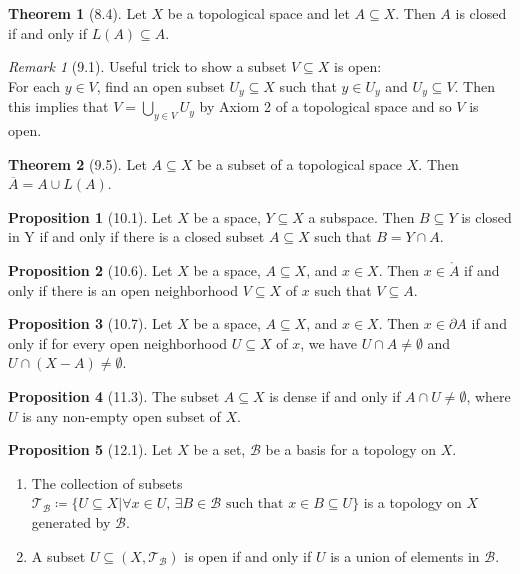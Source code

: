 \documentclass{article}
\newcommand{\B}{\ensuremath{\mathcal{B}}}
\newcommand{\nbd}{neighborhood}
\newcommand{\Iff}{if and only if}
\newcommand{\ts}{topological space}
\newcommand{\es}{\ensuremath{\emptyset}}
\newcommand{\coleq}{\ensuremath{\coloneqq}}
\newcommand{\closure}[1]{\ensuremath{\overline{#1}}}
\newcommand{\tp}{\ensuremath{\mathscr{T}}}
\newcommand{\Ts}[2]{\ensuremath{(#1,#2)}}
\newcommand{\union}{\cup}
\newcommand{\Union}{\bigcup}
\newcommand{\inter}{\cap}
\newcommand{\interior}[1]{\ensuremath{\mathring{#1}}}
\newcommand{\bound}[1]{\ensuremath{\partial #1}}
\renewcommand{\Subset}{\subseteq}
\theoremstyle{definition}
\newtheorem*{thm}{Theorem}
\newtheorem*{prop}{Proposition}
\theoremstyle{remark}
\newtheorem*{rmk}{Remark}
\begin{document}
{        \begin{thm}[8.4]
            Let $X$ be a \ts{} and let $A \Subset X$. Then $A$ is closed \Iff{} $L(A) \Subset A$.
        \end{thm}
        
        \begin{rmk}[9.1]
            Useful trick to show a subset $V \Subset X$ is open:\\ For each $y\in V$, find an open subset $U_y \Subset X$ such that $y \in U_y$ and $U_y \Subset V$. Then this implies that $V=\Union\limits_{y \in V} U_y$ by Axiom 2 of a \ts{} and so $V$ is open.
        \end{rmk}
        
        \begin{thm}[9.5]
            Let $A \Subset X$ be a subset of a \ts{} $X$. Then $\closure{A}=A \union L(A)$.
        \end{thm}
        
        \begin{prop}[10.1]
            Let $X$ be a space, $Y \Subset X$ a subspace. Then $B \Subset Y$ is closed in Y \Iff{} there is a closed subset $A \Subset X$ such that $B=Y \inter A$.
        \end{prop}
        
        \begin{prop}[10.6]
            Let $X$ be a space, $A \Subset X$, and $x \in X$. Then $x\in \interior{A}$ \Iff{} there is an open \nbd{} $V \Subset X$ of $x$ such that $V \Subset A$.
        \end{prop}
        
        \begin{prop}[10.7]
            Let $X$ be a space, $A\Subset X$, and $x \in X$. Then $x \in \bound{A}$ \Iff{} for every open \nbd{} $U \Subset X$ of $x$, we have $U \inter A \neq \es$ and $U \inter (X-A) \neq \es$.
        \end{prop}
        
        \begin{prop}[11.3]
            The subset $A \Subset X$ is dense \Iff{} $A\inter U \neq \es$, where $U$ is any non-empty open subset of $X$.
        \end{prop}
        
        \begin{prop}[12.1]
            Let $X$ be a set, $\B$ be a basis for a topology on $X$.
            \begin{enumerate}
                \item The collection of subsets $\tp_\B \coleq \{U \Subset X | \forall x\in U, \, \exists B \in \B \text{ such that } x\in B \Subset U\}$ is a topology on $X$ generated by $\B$.
                \item A subset $U \Subset \Ts{X}{\tp_\B}$ is open \Iff{} $U$ is a union of elements in $\B$.
            \end{enumerate}
        \end{prop}
        
}
\end{document}
